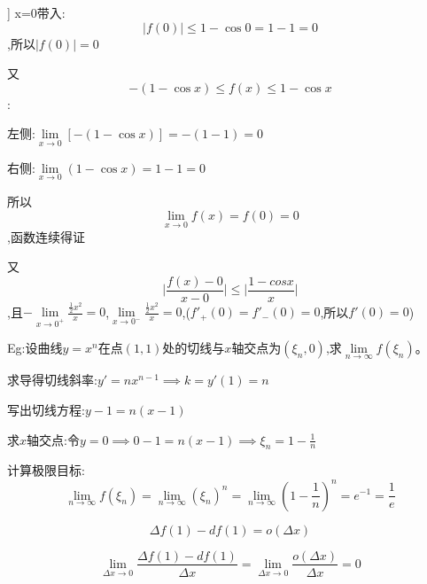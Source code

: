 \documentclass[11pt,a4paper,UTF8]{ctexart}
\begin{document}
\begin{thmbox}[题型二:差商与连续\&可导判定[注意分段讨论]]
x=0带入:
\begin{equation*}
\vert{}f(0)\vert{} \le 1 - \cos 0 = 1 - 1 = 0
\end{equation*}
,所以$|f(0)|=0$

又
\begin{equation*}
-(1 - \cos x) \le f(x) \le 1 - \cos x
\end{equation*}
:

  左侧:$\lim\limits_{x \to 0} [-(1 - \cos x)] = -(1 - 1) = 0$

  右侧:$\lim\limits_{x \to 0} (1 - \cos x) = 1 - 1 = 0$

所以
\begin{equation*}
\lim_{x \to 0} f(x) =f(0)=0
\end{equation*}
,函数连续得证

又
\begin{equation*}
\big|\frac{f(x) - 0}{x - 0}\big| \leq \big|\frac{1-cosx}{x}\big|
\end{equation*}
,且$-\lim\limits_{x \to 0^+} \frac{\frac{1}{2}x^2}{x} = 0$,$\lim\limits_{x \to 0^-} \frac{\frac{1}{2}x^2}{x} = 0$,($f'_+(0) = f'_-(0) = 0$,所以$f'(0) = 0$)

\end{thmbox}
\begin{thmbox}

Eg:设曲线$y = x^n$在点$(1, 1)$处的切线与$x$轴交点为$(\xi_n, 0)$,求$\lim\limits_{n \to \infty} f(\xi_n)$。

  求导得切线斜率:$y' = n x^{n-1} \implies k = y'(1) = n$

  写出切线方程:$y - 1 = n(x - 1)$

  求$x$轴交点:令$y = 0 \implies 0 - 1 = n(x - 1) \implies \xi_n = 1 - \frac{1}{n}$

  计算极限目标:
\begin{equation*}
\lim_{n \to \infty} f(\xi_n) = \lim_{n \to \infty} (\xi_n)^n = \lim_{n \to \infty} \left(1 - \frac{1}{n}\right)^n = e^{-1} = \frac{1}{e}
\end{equation*}


\end{thmbox}

\begin{equation*}
\Delta f(1) - df(1) = o(\Delta x)
\end{equation*}

\begin{equation*}
\lim_{\Delta x \to 0} \frac{\Delta f(1) - df(1)}{\Delta x} = \lim_{\Delta x \to 0} \frac{o(\Delta x)}{\Delta x} = 0
\end{equation*}
\end{document}
